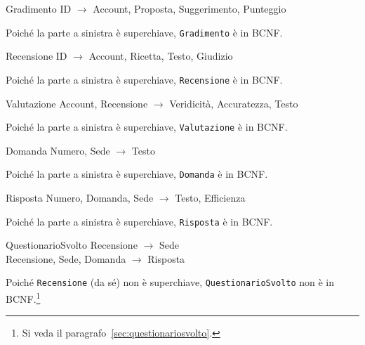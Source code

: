 \begin{samepage}
\begin{funcdep}{Gradimento}
    ID $\to$ Account, Proposta, Suggerimento, Punteggio
\end{funcdep}
Poiché la parte a sinistra è superchiave, {\tt Gradimento} è in BCNF.
\end{samepage}

\begin{samepage}
\begin{funcdep}{Recensione}
    ID $\to$ Account, Ricetta, Testo, Giudizio
\end{funcdep}
Poiché la parte a sinistra è superchiave, {\tt Recensione} è in BCNF.
\end{samepage}

\begin{samepage}
\begin{funcdep}{Valutazione}
    Account, Recensione $\to$ Veridicità, Accuratezza, Testo
\end{funcdep}
Poiché la parte a sinistra è superchiave, {\tt Valutazione} è in BCNF.
\end{samepage}

\begin{samepage}
\begin{funcdep}{Domanda}
    Numero, Sede $\to$ Testo
\end{funcdep}
Poiché la parte a sinistra è superchiave, {\tt Domanda} è in BCNF.
\end{samepage}

\begin{samepage}
\begin{funcdep}{Risposta}
    Numero, Domanda, Sede $\to$ Testo, Efficienza
\end{funcdep}
Poiché la parte a sinistra è superchiave, {\tt Risposta} è in BCNF.
\end{samepage}

\begin{samepage}
\begin{funcdep}{QuestionarioSvolto}
    Recensione $\to$ Sede\\
    Recensione, Sede, Domanda $\to$ Risposta
\end{funcdep}
Poiché {\tt Recensione} (da sé) non è superchiave, {\tt QuestionarioSvolto} non è in BCNF.\footnote{Si veda il paragrafo~\vref{sec:questionariosvolto}.}
\end{samepage}

